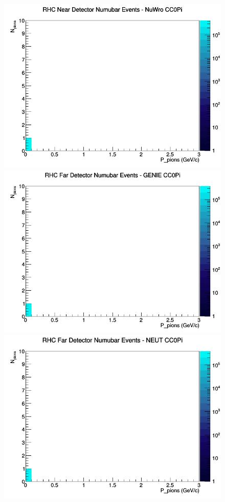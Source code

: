 \documentclass[12pt]{article}
\begin{document}
\begin{figure}[h]
\includegraphics[width=\linewidth]{N_P/nominal/pions/CC0Pi_RHC_ND_numubar_N_P_NuWro.png}
\endminipage
\newline
{}
\includegraphics[width=\linewidth]{N_P/nominal/pions/CC0Pi_RHC_FD_numubar_N_P_GENIE.png}
\endminipage
{}
\includegraphics[width=\linewidth]{N_P/nominal/pions/CC0Pi_RHC_FD_numubar_N_P_NEUT.png}

\end{figure}
\end{document}
